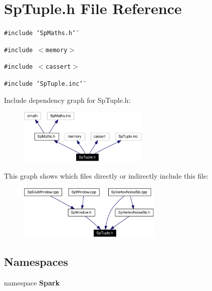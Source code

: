 \section{Sp\-Tuple.h File Reference}
\label{SpTuple_8h}
{\tt \#include \char`\"{}Sp\-Maths.h\char`\"{}}\par
{\tt \#include $<$memory$>$}\par
{\tt \#include $<$cassert$>$}\par
{\tt \#include \char`\"{}Sp\-Tuple.inc\char`\"{}}\par


Include dependency graph for Sp\-Tuple.h:\begin{figure}[H]
\begin{center}
\leavevmode
\includegraphics[width=176pt]{SpTuple_8h__incl}
\end{center}
\end{figure}


This graph shows which files directly or indirectly include this file:\begin{figure}[H]
\begin{center}
\leavevmode
\includegraphics[width=194pt]{SpTuple_8h__dep__incl}
\end{center}
\end{figure}
\subsection*{Namespaces}
\begin{CompactItemize}
\item 
namespace {\bf Spark}
\end{CompactItemize}
